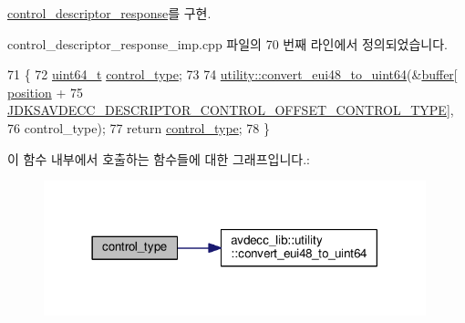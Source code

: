 \hyperlink{classavdecc__lib_1_1control__descriptor__response_a42f802f93bee2befbc4be67955e0e7e1}{control\+\_\+descriptor\+\_\+response}를 구현.



control\+\_\+descriptor\+\_\+response\+\_\+imp.\+cpp 파일의 70 번째 라인에서 정의되었습니다.


\begin{DoxyCode}
71 \{
72     \hyperlink{parse_8c_aec6fcb673ff035718c238c8c9d544c47}{uint64\_t} \hyperlink{classavdecc__lib_1_1control__descriptor__response__imp_afbaadc05125e0f7bd40999c16d4b3003}{control\_type};
73 
74     \hyperlink{namespaceavdecc__lib_1_1utility_a93805682670fa173878eaecac28efc2c}{utility::convert\_eui48\_to\_uint64}(&\hyperlink{classavdecc__lib_1_1descriptor__response__base__imp_a56ed84df35de10bdb65e72b184309497}{buffer}[
      \hyperlink{classavdecc__lib_1_1descriptor__response__base__imp_a7a04afe5347934be732ec70a70bd0a28}{position} +
75                                              
      \hyperlink{group__descriptor__control_ga01b8a5d6bfd748119eafd911252fe644}{JDKSAVDECC\_DESCRIPTOR\_CONTROL\_OFFSET\_CONTROL\_TYPE}],
76                                      control\_type);
77     \textcolor{keywordflow}{return} \hyperlink{classavdecc__lib_1_1control__descriptor__response__imp_afbaadc05125e0f7bd40999c16d4b3003}{control\_type};
78 \}
\end{DoxyCode}


이 함수 내부에서 호출하는 함수들에 대한 그래프입니다.\+:
\nopagebreak
\begin{figure}[H]
\begin{center}
\leavevmode
\includegraphics[width=314pt]{classavdecc__lib_1_1control__descriptor__response__imp_afbaadc05125e0f7bd40999c16d4b3003_cgraph}
\end{center}
\end{figure}


